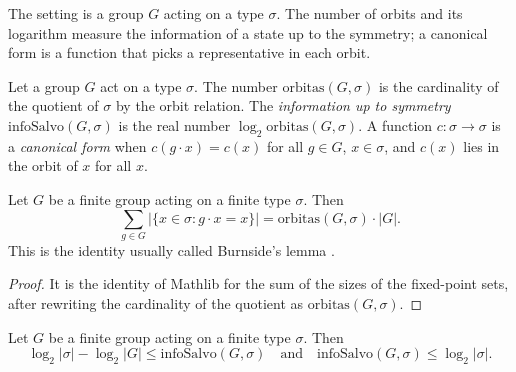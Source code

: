 The setting is a group $G$ acting on a type $\sigma$. The number of orbits and its logarithm
measure the information of a state up to the symmetry; a canonical form is a function that picks
a representative in each orbit.

\begin{definition}
  \label{def:barriers-orbits}
  \leanok
  Let a group $G$ act on a type $\sigma$. The number $\mathrm{orbitas}(G, \sigma)$ is the cardinality
  of the quotient of $\sigma$ by the orbit relation. The \emph{information up to symmetry}
  $\mathrm{infoSalvo}(G, \sigma)$ is the real number $\log_2 \mathrm{orbitas}(G, \sigma)$. A function
  $c : \sigma \to \sigma$ is a \emph{canonical form} when $c(g \cdot x) = c(x)$ for all $g \in G$,
  $x \in \sigma$, and $c(x)$ lies in the orbit of $x$ for all $x$.
  \own{}
\end{definition}

\begin{theorem}
  \label{thm:barriers-burnside}
  \leanok
  Let $G$ be a finite group acting on a finite type $\sigma$. Then
  \[
    \sum_{g \in G} \bigl|\{x \in \sigma : g \cdot x = x\}\bigr|
      = \mathrm{orbitas}(G, \sigma) \cdot |G| .
  \]
  This is the identity usually called Burnside's lemma \cite{Burnside}.
  \own{}
\end{theorem}

\begin{proof}
  \leanok
  It is the identity of Mathlib for the sum of the sizes of the fixed-point sets, after rewriting
  the cardinality of the quotient as $\mathrm{orbitas}(G, \sigma)$.
\end{proof}

\begin{theorem}
  \label{thm:barriers-ahorro-acotado}
  \leanok
  Let $G$ be a finite group acting on a finite type $\sigma$. Then
  \[
    \log_2 |\sigma| - \log_2 |G| \le \mathrm{infoSalvo}(G, \sigma)
    \quad\text{and}\quad
    \mathrm{infoSalvo}(G, \sigma) \le \log_2 |\sigma| .
  \]
  \own{}
\end{theorem}

